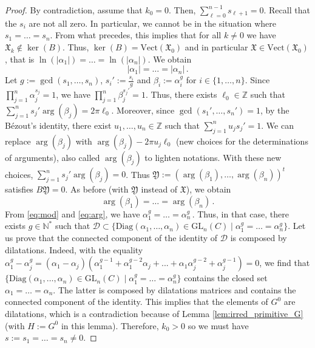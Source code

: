 \documentclass[a4paper,11pt]{amsart}
\newcommand{\GL}{\operatorname{GL}}
\def\GL{\mathrm{GL}}
\begin{document}
\begin{proof}
By contradiction, assume that  $k_0=0$.  Then,  $\sum_{\ell=0}^{n-1} s_{\ell+1}=0$.  Recall that the $s_i$ are not all zero.  In particular,  we cannot be in the situation where $s_1=\dots=s_n$. From what precedes,  this implies that for all  $k\neq0$  we have $\mathfrak{X}_k\notin\ker(B)$.  Thus, $\ker(B)=\mathrm{Vect}(\mathfrak{X}_0)$ and in particular $\mathfrak{X}\in \mathrm{Vect}(\mathfrak{X}_0)$, that is $\ln(|\alpha_{1}|)=\dots=\ln(|\alpha_{n}|)$. We obtain 
\begin{equation}
\label{eq:mod}
|\alpha_1|=\ldots = |\alpha_n|\, .    
\end{equation}  Let $g:=\gcd(s_1,\ldots,s_n)$, $s_i':=\frac{s_i}{g}$ and $\beta_i := \alpha_i^g$ for $i\in \lbrace 1,\ldots, n\rbrace$. Since $\prod\limits_{j=1}^n \alpha_j^{s_j}=1$, we have $\prod\limits_{j=1}^n \beta_j^{s_j'}=1$. Thus,  there exists $\ell_0\in\mathbb Z$ such that $\sum_{j=1}^{n}s_j' \arg(\beta_j) = 2\pi \ell_0$. Moreover, since $\gcd(s_1',\ldots,s_n') = 1$, by the Bézout's identity, there exist $u_1,\ldots, u_n\in\mathbb{Z}$ such that  $\sum_{j=1}^{n}u_js_j' = 1$.  We can replace $\arg(\beta_j)$ with $\arg(\beta_j) - 2\pi u_j\ell_0$ (new choices for the determinations of arguments), also called $\arg(\beta_j)$ to lighten notations. With these new choices, $\sum_{j=1}^{n}s_j' \arg(\beta_j) = 0$. Thus $\mathfrak{Y}:=(\arg(\beta_1),\ldots,\arg(\beta_n))^t$ satisfies $B\mathfrak{Y}=0$. As before (with $\mathfrak Y$ instead of $\mathfrak X$), we obtain 
\begin{equation}
\label{eq:arg}
\arg(\beta_1)=\ldots=\arg(\beta_n)\, .    
\end{equation} 
From \eqref{eq:mod} and \eqref{eq:arg}, we have
$
\alpha_1^g = \ldots = \alpha_n^g \, .
$
 Thus, in that case, there exists $g\in \mathbb{N}^*$ such that $\mathcal{D}\subset \lbrace \mathrm{Diag}(\alpha_1,\ldots,\alpha_n) \in\GL_n\left( C\right)\mid \alpha_1^g = \ldots = \alpha_n^g\rbrace$. Let us prove that  the connected component of the identity of $\mathcal{D}$ is composed by dilatations.  Indeed,  with the equality $\alpha_1^g-\alpha_j^g=(\alpha_1-\alpha_j)(\alpha_1^{g-1}+\alpha_1^{g-2}\alpha_j + ... + \alpha_1 \alpha_j^{g-2}+ \alpha_j^{g-1})=0$, we find that $\lbrace \mathrm{Diag}(\alpha_1,\ldots,\alpha_n) \in\GL_n\left( C\right)\mid \alpha_1^g = \ldots = \alpha_n^g\rbrace$ contains the closed set $\alpha_1=\ldots = \alpha_n$. The latter is composed by dilatations matrices and contains  the connected component of the identity. This implies that the elements of $G^0$ are dilatations, which is a contradiction because of Lemma \ref{lem:irred_primitive_G} (with $H:=G^0$ in this lemma).  Therefore, $k_0>0$ so we must have $s:=s_1=\dots=s_n\neq 0$.
\color{black}


\end{proof}
\end{document}
